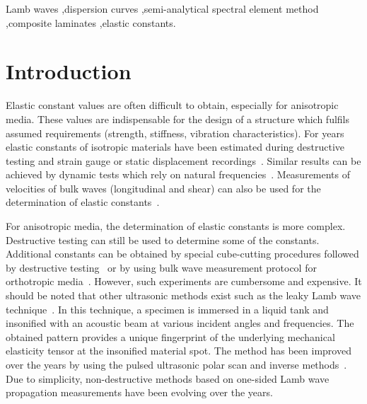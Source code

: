 \documentclass[preprint,12pt]{elsarticle}
\begin{document}
\begin{frontmatter}
		\begin{keyword}
			Lamb waves \sep dispersion curves \sep semi-analytical spectral element method \sep composite laminates \sep elastic constants.
			
			
		\end{keyword}
		
	\end{frontmatter}
	
	
	\section{Introduction}
	Elastic constant values are often difficult to obtain, especially for anisotropic media. These values are indispensable for the design of a structure which fulfils assumed requirements (strength, stiffness, vibration characteristics). For years elastic constants of isotropic materials have been estimated during destructive testing and strain gauge or static displacement recordings~\cite{Wang2000}. Similar results can be achieved by dynamic tests which rely on natural frequencies~\cite{Wang2000a, Wesolowski2009,Beluch2014}. Measurements of velocities of bulk waves (longitudinal and shear) can also be used for the determination of elastic constants~\cite{Rose1999}.
	
	For anisotropic media, the determination of elastic constants is more complex. Destructive testing can still be used to determine some of the constants. Additional constants can be obtained by special cube-cutting procedures followed by destructive testing~\cite{Rose1991} or by using bulk wave measurement protocol for orthotropic media~\cite{Rose1999}. However, such experiments are cumbersome and expensive.  It should be noted that other ultrasonic methods exist such as the leaky Lamb wave technique~\cite{Karim1990,Karim1990a}. In this technique, a specimen is immersed in a liquid tank and insonified with an acoustic beam at various incident angles and frequencies. The obtained pattern provides a unique fingerprint of the underlying mechanical elasticity tensor at the insonified material spot. The method has been improved over the years by using the pulsed ultrasonic polar scan and inverse methods~\cite{Kersemans2014,Martens2017}. Due to simplicity, non-destructive methods based on one-sided Lamb wave propagation measurements have been evolving over the years.
	
\end{document}
